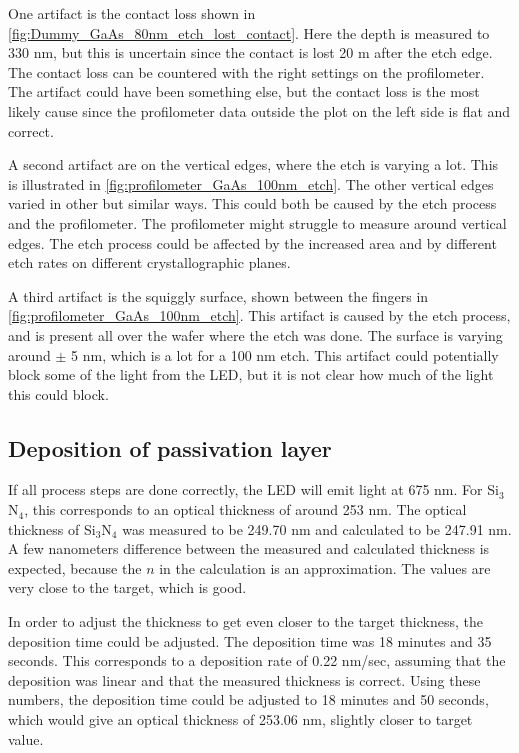 One artifact is the contact loss shown in \autoref{fig:Dummy_GaAs_80nm_etch_lost_contact}. 
Here the depth is measured to 330 nm, but this is uncertain since the contact is lost 20 \textmu m after the etch edge.
The contact loss can be countered with the right settings on the profilometer. 
The artifact could have been something else, but the contact loss is the most likely cause since the profilometer data outside the plot on the left side is flat and correct. 

A second artifact are on the vertical edges, where the etch is varying a lot. 
This is illustrated in \autoref{fig:profilometer_GaAs_100nm_etch}.
The other vertical edges varied in other but similar ways. 
This could both be caused by the etch process and the profilometer.
The profilometer might struggle to measure around vertical edges. 
The etch process could be affected by  the increased area and by different etch rates on different crystallographic planes.

A third artifact is the squiggly surface, shown between the fingers in \autoref{fig:profilometer_GaAs_100nm_etch}. 
This artifact is caused by the etch process, and is present all over the wafer where the etch was done. 
The surface is varying around $\pm$ 5 nm, which is a lot for a 100 nm etch.
This artifact could potentially block some of the light from the LED, but it is not clear how much of the light this could block.

\subsection{Deposition of passivation layer} 
If all process steps are done correctly, the LED will emit light at 675 nm.  
For Si$_3$N$_4$, this corresponds to an optical thickness of around 253 nm.
The optical thickness of Si$_3$N$_4$ was measured to be 249.70 nm and calculated to be 247.91 nm.
A few nanometers difference between the measured and calculated thickness is expected, because the $n$ in the calculation is an approximation. 
The values are very close to the target, which is good.

In order to adjust the thickness to get even closer to the target thickness, the deposition time could be adjusted.
The deposition time was 18 minutes and 35 seconds.
This corresponds to a deposition rate of 0.22 nm/sec, assuming that the deposition was linear and that the measured thickness is correct.
Using these numbers, the deposition time could be adjusted to 18 minutes and 50 seconds, which would give an optical thickness of 253.06 nm, slightly closer to target value.

